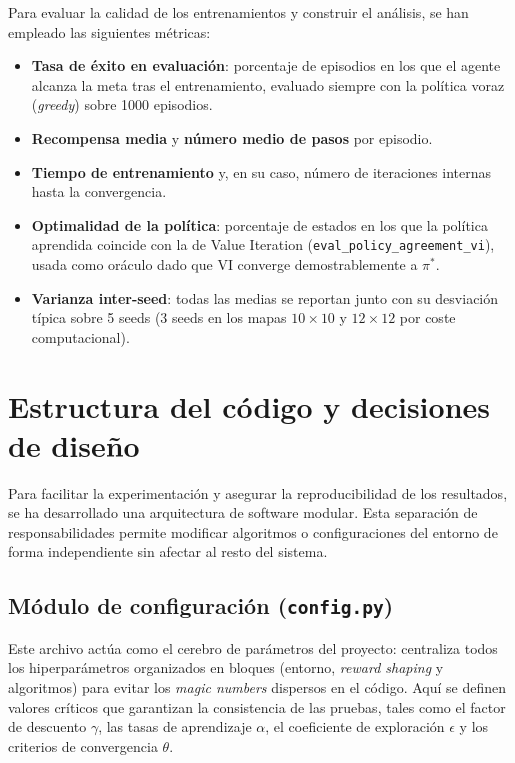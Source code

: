 \documentclass[11pt,a4paper]{article}
\begin{document}
Para evaluar la calidad de los entrenamientos y construir el análisis, se han empleado las siguientes métricas:
\begin{itemize}
  \item \textbf{Tasa de éxito en evaluación}: porcentaje de episodios en los que el agente alcanza la meta tras el entrenamiento, evaluado siempre con la política voraz (\emph{greedy}) sobre 1000 episodios.
  \item \textbf{Recompensa media} y \textbf{número medio de pasos} por episodio.
  \item \textbf{Tiempo de entrenamiento} y, en su caso, número de iteraciones internas hasta la convergencia.
  \item \textbf{Optimalidad de la política}: porcentaje de estados en los que la política aprendida coincide con la de Value Iteration (\texttt{eval\_policy\_agreement\_vi}), usada como oráculo dado que VI converge demostrablemente a $\pi^\ast$.
  \item \textbf{Varianza inter-seed}: todas las medias se reportan junto con su desviación típica sobre 5 seeds (3 seeds en los mapas $10\times 10$ y $12\times 12$ por coste computacional).
\end{itemize}

\section{Estructura del código y decisiones de diseño}

Para facilitar la experimentación y asegurar la reproducibilidad de los resultados, se ha desarrollado una arquitectura de software modular. Esta separación de responsabilidades permite modificar algoritmos o configuraciones del entorno de forma independiente sin afectar al resto del sistema.

\subsection{Módulo de configuración (\texttt{config.py})}

Este archivo actúa como el cerebro de parámetros del proyecto: centraliza todos los hiperparámetros organizados en bloques (entorno, \emph{reward shaping} y algoritmos) para evitar los \emph{magic numbers} dispersos en el código. Aquí se definen valores críticos que garantizan la consistencia de las pruebas, tales como el factor de descuento $\gamma$, las tasas de aprendizaje $\alpha$, el coeficiente de exploración $\epsilon$ y los criterios de convergencia $\theta$.
\end{document}
